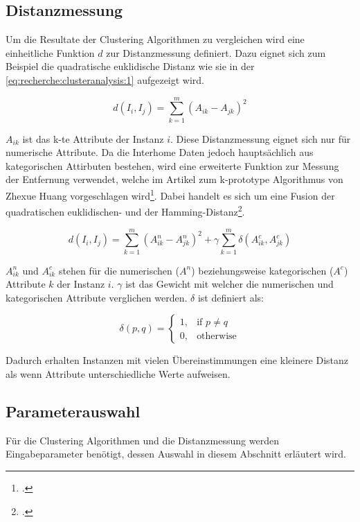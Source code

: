 \subsection{Distanzmessung}
\label{sec:konzept:anwendungderalgorithmen:distanzmessung}
Um die Resultate der Clustering Algorithmen zu vergleichen wird eine einheitliche Funktion $d$ zur Distanzmessung definiert.
Dazu eignet sich zum Beispiel die quadratische euklidische Distanz wie sie in der \cref{eq:recherche:clusteranalysis:1} aufgezeigt wird.

\begin{equation} \label{eq:recherche:clusteranalysis:1}
d(I_i, I_j) = \sum_{k=1}^{m} (A_{ik} - A_{jk})^2
\end{equation}

$A_{ik}$ ist das k-te Attribute der Instanz $i$. 
Diese Distanzmessung eignet sich nur für numerische Attribute.
Da die Interhome Daten jedoch hauptsächlich aus kategorischen Attirbuten bestehen, wird  eine erweiterte Funktion zur Messung der Entfernung verwendet, welche im Artikel zum k-prototype Algorithmus von Zhexue Huang vorgeschlagen wird\footcite{clustering_numeric_and_categorical_values}.
Dabei handelt es sich um eine Fusion der quadratischen euklidischen- und der Hamming-Distanz\footcite{data_mining_concepts_and_techniques}.

\begin{equation} \label{eq:recherche:clusteranalysis:2}
d(I_i, I_j) = \sum_{k=1}^{m} (A^n_{ik} - A^n_{jk})^2 + \gamma \sum_{k=1}^{m} \delta(A^c_{ik}, A^c_{jk})
\end{equation}

$A^n_{ik}$ und $A^c_{ik}$ stehen für die numerischen ($A^n$) beziehungsweise kategorischen ($A^c$) Attribute $k$ der Instanz $i$. 
$\gamma$ ist das Gewicht mit welcher die numerischen und kategorischen Attribute verglichen werden.
$\delta$ ist definiert als:

\begin{equation} \label{eq:recherche:clusteranalysis:3}
\delta(p,q)= 
\begin{cases}
1,				& \text{if } p \neq q\\
0,              & \text{otherwise}
\end{cases}
\end{equation}

Dadurch erhalten Instanzen mit vielen Übereinstimmungen eine kleinere Distanz als wenn Attribute unterschiedliche Werte aufweisen.

\subsection{Parameterauswahl}
\label{sec:konzept:parameterauswahl}
Für die Clustering Algorithmen und die Distanzmessung werden Eingabeparameter benötigt, dessen Auswahl in diesem Abschnitt erläutert wird.

